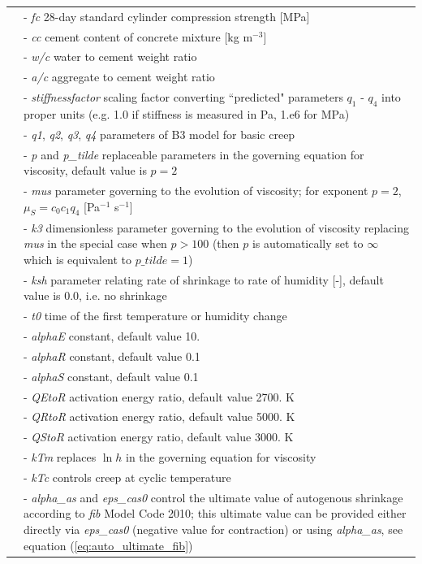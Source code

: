 \documentclass[a4paper]{article}
\newcommand{\param}[1]{{\it #1}}
\newenvironment{mmt}{\begin{tabular}{|l|p{9cm}|}}{\end{tabular}\\}
\newenvironment{mmt}{\begin{tabular}{|l|l|}}{\end{tabular}\\}
\begin{document}
\begin{table}[!htb]
\begin{mmt}
\hline
%
&- \param{fc} 28-day standard cylinder compression strength [MPa]\\
&- \param{cc} cement content of concrete mixture  [kg m$^{-3}$] \\
&- \param{w/c} water to cement weight ratio\\
&- \param{a/c} aggregate to cement weight ratio\\
&- \param{stiffnessfactor} scaling factor converting ``predicted" parameters $q_1$ - $q_4$ into proper units (e.g. 1.0 if stiffness is measured in Pa, 1.e6 for MPa)\\
&- \param{q1}, \param{q2}, \param{q3}, \param{q4} parameters of B3 model for basic creep\\
%
&- \param{p} and \param{p\_tilde} replaceable parameters in the governing equation for viscosity, default value is $p = 2$ \\
&- \param{mus} parameter governing to the evolution of viscosity; for exponent $p=2$, $\mu_S = c_0 c_1 q_4$ [Pa$^{-1}$ s$^{-1}$] \\
&- \param{k3} dimensionless parameter governing to the evolution of viscosity replacing \param{mus} in the special case when $p > 100$ (then $p$ is automatically set to $\infty$ which is equivalent to $p\_tilde = 1$)\\
&- \param{ksh} parameter relating rate of shrinkage to rate of humidity [-], default value is 0.0, i.e. no shrinkage\\
&- \param{t0} time of the first temperature or humidity change\\
&- \param{alphaE} constant, default value 10.\\
&- \param{alphaR} constant, default value 0.1\\
&- \param{alphaS} constant, default value 0.1\\
&- \param{QEtoR} activation energy ratio, default value 2700. K\\
&- \param{QRtoR} activation energy ratio, default value 5000. K\\
&- \param{QStoR} activation energy ratio, default value 3000. K\\
&- \param{kTm} replaces $\ln{h}$ in the governing equation for viscosity\\
&- \param{kTc} controls creep at cyclic temperature \\
&- \param{alpha\_as} and \param{eps\_cas0} control the ultimate value of autogenous shrinkage according to {\sl{fib}} Model Code 2010; this ultimate value can be provided either directly via \param{eps\_cas0} (negative value for contraction) or  using \param{alpha\_as}, see equation (\ref{eq:auto_ultimate_fib})\\

\end{mmt}
\end{table}
\end{document}
